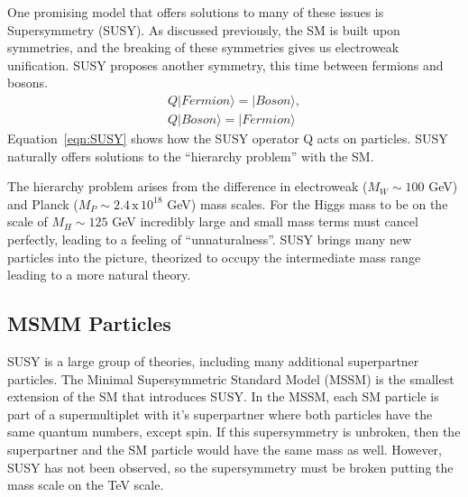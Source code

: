 	One promising model that offers solutions to many of these issues is Supersymmetry (SUSY). As discussed previously, the SM is built upon symmetries, and the breaking of these symmetries gives us electroweak unification. SUSY proposes another symmetry, this time between fermions and bosons. 
	\begin{equation}\label{eqn:SUSY}
	\begin{split}
		Q | Fermion \rangle = | Boson \rangle, \\
		Q | Boson \rangle = | Fermion \rangle
	\end{split}
	\end{equation}
	Equation~\ref{eqn:SUSY} shows how the SUSY operator Q acts on particles.  SUSY naturally offers solutions to the ``hierarchy problem'' with the SM. 

	The hierarchy problem arises from the difference in electroweak ($M_W\sim100$ GeV)  and Planck ($M_P\sim2.4\, \mathrm{x} \, 10^{18}$ GeV) mass scales. For the Higgs mass to be on the scale of $M_H \sim 125$ GeV incredibly large and small mass terms must cancel perfectly, leading to a feeling of ``unnaturalness''. SUSY brings many new particles into the picture, theorized to occupy the intermediate mass range leading to a more natural theory.

	\subsection{MSMM Particles}\label{ssec:MSMM}
		SUSY is a large group of theories, including many additional superpartner particles. The Minimal Supersymmetric Standard Model (MSSM) is the smallest extension of the SM that introduces SUSY. In the MSSM, each SM particle is part of a supermultiplet with it's superpartner where both particles have the same quantum numbers, except spin. If this supersymmetry is unbroken, then the superpartner and the SM particle would have the same mass as well. However, SUSY has not been observed, so the supersymmetry must be broken putting the mass scale on the TeV scale. 

